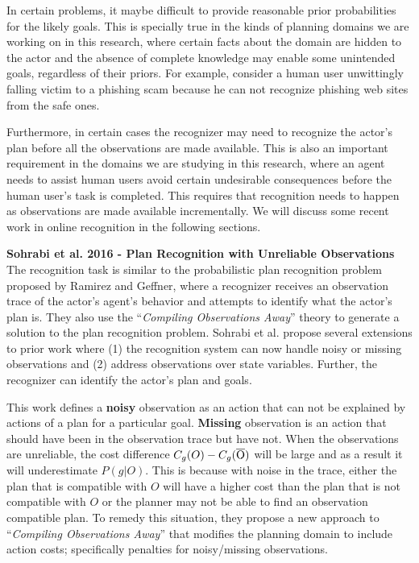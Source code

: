 In certain problems, it maybe difficult to provide reasonable prior probabilities for the likely goals. This is specially true in the kinds of planning domains we are working on in this research, where certain facts about the domain are hidden to the actor and the absence of complete knowledge may enable some unintended goals, regardless of their priors. For example, consider a human user unwittingly falling victim to a phishing scam because he can not recognize phishing web sites from the safe ones.

Furthermore, in certain cases the recognizer may need to recognize the actor's plan before all the observations are made available. This is also an important requirement in the domains we are studying in this research, where an agent needs to assist human users avoid certain undesirable consequences before the human user's task is completed. This requires that recognition needs to happen as observations are made available incrementally. We will discuss some recent work in online recognition in the following sections.

\noindent\textbf{Sohrabi et al. 2016 - Plan Recognition with Unreliable Observations}\\
The recognition task is similar to the probabilistic plan recognition problem proposed by Ramirez and Geffner, where a recognizer receives an observation trace of the actor's agent's behavior and attempts to identify what the actor's plan is. They also use the ``\textit{Compiling Observations Away}'' theory to generate a solution to the plan recognition problem. Sohrabi et al. propose several extensions to prior work where (1) the recognition system can now handle noisy or missing observations and (2) address observations over state variables. Further, the recognizer can identify the actor's plan and goals.

This work defines a \textbf{noisy} observation as an action that can not be explained by actions of a plan for a particular goal. \textbf{Missing} observation is an action that should have been in the observation trace but have not. When the observations are unreliable, the cost difference $C_g(O) - C_g{(\overline{\rm O})}$ will be large and as a result it will underestimate $P(g|O)$. This is because with noise in the trace, either the plan that is compatible with $O$ will have a higher cost than the plan that is not compatible with $O$ or the planner may not be able to find an observation compatible plan. To remedy this situation, they propose a new approach to ``\textit{Compiling Observations Away}'' that modifies the planning domain to include action costs; specifically penalties for noisy/missing observations.

